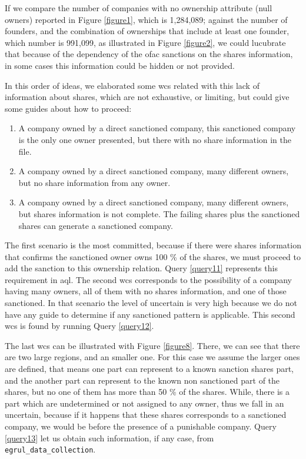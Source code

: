 \begin{spacing}{1.5}
If we compare the number of companies with no ownership attribute (null owners) reported in Figure \ref{figure1}, which is 1,284,089; against the number of founders, and the combination of ownerships that include at least one founder, which number is 991,099, as illustrated  in Figure \ref{figure2}, we could lucubrate that because of the dependency of the \gls{ofac} sanctions on the shares information, in some cases this information could be hidden or not provided.   

In this order of ideas, we elaborated some \gls{wcs} related with this lack of information about shares, which are not exhaustive, or limiting, but could give some guides about how to proceed:

\begin{enumerate}
	\item A company owned by a direct sanctioned company, this sanctioned company is the only one owner presented, but there with no share information in the file.
	\item A company owned by a direct sanctioned company, many different owners, but no share information from any owner. 
	\item A company owned by a direct sanctioned company, many different owners, but shares information is not complete. The failing shares plus the sanctioned shares can generate a sanctioned company. 
\end{enumerate}


 The first scenario is the most committed, because if there were shares information that confirms the sanctioned owner owns 100 \% of the shares, we must proceed to add the sanction to this ownership relation. Query \ref{query11} represents this requirement in \gls{aql}. The second \gls{wcs} corresponds to the possibility of a company having many owners, all of them with no shares information, and one of those sanctioned. In that scenario the level of uncertain is very high because we do not have any guide to determine if any sanctioned pattern is applicable. This second \gls{wcs} is found by running Query \ref{query12}. 
 
 The last \gls{wcs} can be illustrated with Figure \ref{figure8}. There, we can see that there are two large regions, and an smaller one. For this case we assume the larger ones are defined, that means one part can represent to a known sanction shares part, and the another part can represent to the known non sanctioned part of the shares, but no one of them has more than 50 \% of the shares. While, there is a part which are undetermined or not assigned to any owner, thus we fall in an uncertain, because if it happens that these shares corresponds to a sanctioned company, we would be before the presence of a punishable company. Query \ref{query13} let us obtain such information, if any case, from  \texttt{egrul\_data\_collection}.
 

\end{spacing}
